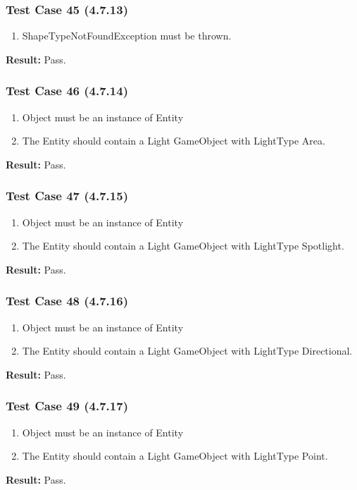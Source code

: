 \documentclass[a4paper,12pt]{article}
\begin{document}
		\subsubsection{Test Case 45 (4.7.13)}
				\begin{enumerate}
					\item ShapeTypeNotFoundException must be thrown.
				\end{enumerate}
			\textbf{Result: }Pass.
		\subsubsection{Test Case 46 (4.7.14)}
				\begin{enumerate}
					\item Object must be an instance of Entity
					\item The Entity should contain a Light GameObject with LightType Area.
				\end{enumerate}
			\textbf{Result: }Pass.
		\subsubsection{Test Case 47 (4.7.15)}
				\begin{enumerate}
					\item Object must be an instance of Entity
					\item The Entity should contain a Light GameObject with LightType Spotlight.
				\end{enumerate}
			\textbf{Result: }Pass.
		\subsubsection{Test Case 48 (4.7.16)}
				\begin{enumerate}
					\item Object must be an instance of Entity
					\item The Entity should contain a Light GameObject with LightType Directional.
				\end{enumerate}
			\textbf{Result: }Pass.
		\subsubsection{Test Case 49 (4.7.17)}
				\begin{enumerate}
					\item Object must be an instance of Entity
					\item The Entity should contain a Light GameObject with LightType Point.
				\end{enumerate}
			\textbf{Result: }Pass.
\end{document}
